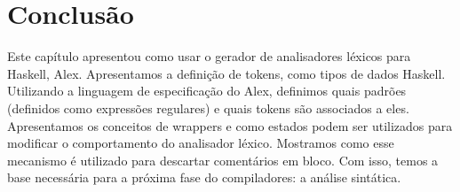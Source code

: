 \section{Conclusão}

Este capítulo apresentou como usar o gerador de analisadores léxicos
para Haskell, Alex. Apresentamos a definição de tokens, como tipos de
dados Haskell. Utilizando a linguagem de especificação do Alex,
definimos quais padrões (definidos como expressões regulares) e quais
tokens são associados a eles. Apresentamos os conceitos de wrappers e
como estados podem ser utilizados para modificar o comportamento do
analisador léxico. Mostramos como esse mecanismo é utilizado para
descartar comentários em bloco. Com isso, temos a base necessária
para a próxima fase do compiladores: a análise sintática.
